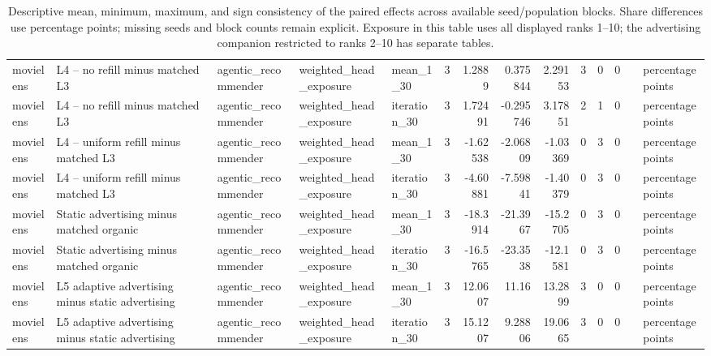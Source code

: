 \begin{table}[htbp!]
\begin{tabular}{lllllrrrrrrrll}
movielens & L4 -- no refill minus matched L3 & agentic\_recommender & weighted\_head\_exposure & mean\_1\_30 & 3 & 1.2889 & 0.375844 & 2.29153 & 3 & 0 & 0 &  & percentage points \\
movielens & L4 -- no refill minus matched L3 & agentic\_recommender & weighted\_head\_exposure & iteration\_30 & 3 & 1.72491 & -0.295746 & 3.17851 & 2 & 1 & 0 &  & percentage points \\
movielens & L4 -- uniform refill minus matched L3 & agentic\_recommender & weighted\_head\_exposure & mean\_1\_30 & 3 & -1.62538 & -2.06809 & -1.03369 & 0 & 3 & 0 &  & percentage points \\
movielens & L4 -- uniform refill minus matched L3 & agentic\_recommender & weighted\_head\_exposure & iteration\_30 & 3 & -4.60881 & -7.59841 & -1.40379 & 0 & 3 & 0 &  & percentage points \\
movielens & Static advertising minus matched organic & agentic\_recommender & weighted\_head\_exposure & mean\_1\_30 & 3 & -18.3914 & -21.3967 & -15.2705 & 0 & 3 & 0 &  & percentage points \\
movielens & Static advertising minus matched organic & agentic\_recommender & weighted\_head\_exposure & iteration\_30 & 3 & -16.5765 & -23.3538 & -12.1581 & 0 & 3 & 0 &  & percentage points \\
movielens & L5 adaptive advertising minus static advertising & agentic\_recommender & weighted\_head\_exposure & mean\_1\_30 & 3 & 12.0607 & 11.16 & 13.2899 & 3 & 0 & 0 &  & percentage points \\
movielens & L5 adaptive advertising minus static advertising & agentic\_recommender & weighted\_head\_exposure & iteration\_30 & 3 & 15.1207 & 9.28806 & 19.0665 & 3 & 0 & 0 &  & percentage points \\
\hline
\end{tabular}
\caption{Descriptive mean, minimum, maximum, and sign consistency of the paired effects across available seed/population blocks. Share differences use percentage points; missing seeds and block counts remain explicit. Exposure in this table uses all displayed ranks 1--10; the advertising companion restricted to ranks 2--10 has separate tables.}
\label{chap:results:tab:rq1_seed_consistency_weighted_head_exposure}
\end{table}
